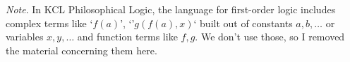 \documentclass[../../../../include/open-logic-chapter]{subfiles}
\begin{document}

\emph{Note}. In KCL Philosophical Logic, the language for first-order
logic includes complex terms like `$f(a)$', `'$g(f(a),x)$` built out 
of constants $a,b,\ldots$ or variables $x,y,\ldots$ and function 
terms like $f,g$. We don't use those, 
so I removed the material concerning them here.




\OLEndChapterHook
\end{document}
